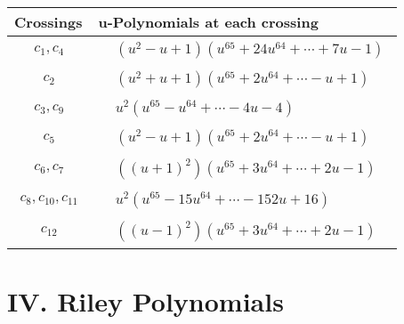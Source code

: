 \documentclass[1p]{elsarticle_modified}
\theoremstyle{definition}
\begin{document}
\begin{tabular}{m{50pt}|m{274pt}}
Crossings & \hspace{64pt}u-Polynomials at each crossing \\
\hline $$\begin{aligned}c_{1},c_{4}\end{aligned}$$&$\begin{aligned}
&(u^2- u+1)(u^{65}+24 u^{64}+\cdots+7 u-1)
\end{aligned}$\\
\hline $$\begin{aligned}c_{2}\end{aligned}$$&$\begin{aligned}
&(u^2+u+1)(u^{65}+2 u^{64}+\cdots- u+1)
\end{aligned}$\\
\hline $$\begin{aligned}c_{3},c_{9}\end{aligned}$$&$\begin{aligned}
&u^2(u^{65}- u^{64}+\cdots-4 u-4)
\end{aligned}$\\
\hline $$\begin{aligned}c_{5}\end{aligned}$$&$\begin{aligned}
&(u^2- u+1)(u^{65}+2 u^{64}+\cdots- u+1)
\end{aligned}$\\
\hline $$\begin{aligned}c_{6},c_{7}\end{aligned}$$&$\begin{aligned}
&((u+1)^2)(u^{65}+3 u^{64}+\cdots+2 u-1)
\end{aligned}$\\
\hline $$\begin{aligned}c_{8},c_{10},c_{11}\end{aligned}$$&$\begin{aligned}
&u^2(u^{65}-15 u^{64}+\cdots-152 u+16)
\end{aligned}$\\
\hline $$\begin{aligned}c_{12}\end{aligned}$$&$\begin{aligned}
&((u-1)^2)(u^{65}+3 u^{64}+\cdots+2 u-1)
\end{aligned}$\\
\hline
\end{tabular}\newpage\renewcommand{\arraystretch}{1}
\centering \section*{ IV. Riley Polynomials}
\end{document}
